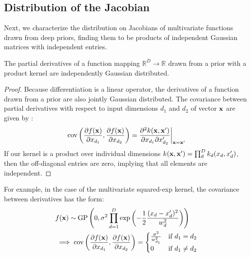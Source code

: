 \documentclass{article} %
\begin{document}
\subsection{Distribution of the Jacobian}
\label{sec:theorem}
Next, we characterize the distribution on Jacobians of multivariate functions drawn from deep \gp{} priors, finding them to be products of independent Gaussian matrices with independent entries.

\begin{lemma}
\label{thm:deriv-ind}
The partial derivatives of a function mapping $\mathbb{R}^D \rightarrow \mathbb{R}$ drawn from a \gp{} prior with a product kernel are independently Gaussian distributed.
\end{lemma}
%
\begin{proof}
Because differentiation is a linear operator, the derivatives of a function drawn from a \gp{} prior are also jointly Gaussian distributed.
The covariance between partial derivatives with respect to input dimensions $d_1$ and $d_2$ of vector ${\bf{x}}$ are given by \citet{Solak03derivativeobservations}:
%
\begin{align}
\operatorname{cov} \left( \frac{\partial f({\bf{x}})}{\partial x_{d_1}}, \frac{\partial f({\bf{x}})}{\partial x_{d_2}} \right) 
= \frac{\partial^2 k({\bf{x}}, {\bf{x}}')}{\partial x_{d_1} \partial x_{d_2}'} \bigg|_{{\bf{x}}={\bf{x}}'}
\label{eq:deriv-kernel}
\end{align}
%
If our kernel is a product over individual dimensions $k({\bf{x}}, {\bf{x}}') = \prod_d^D k_d(x_d, x_d')$, 
then the off-diagonal entries are zero, implying that all elements are independent.
\end{proof}

For example, in the case of the multivariate squared-exp kernel, the covariance between derivatives has the form:
%
\begin{align}
& f({\bf{x}}) \sim \textnormal{GP}\left( 0, 
\sigma^2 \prod_{d=1}^D \exp \left(-\frac{1}{2} \frac{(x_d - x_d')^2}{w_d^2} \right) \right) \nonumber \\
& \implies 
\operatorname{cov} \left( \frac{\partial f({\bf{x}})}{\partial x_{d_1}}, \frac{\partial f({\bf{x}})}{\partial x_{d_2}} \right) =
\begin{cases} 
\frac{\sigma^2}{w_{d_1}^2} & \mbox{if } d_1 = d_2 \\ 
0 & \mbox{if } d_1 \neq d_2 \end{cases}
\end{align}
\end{document}
